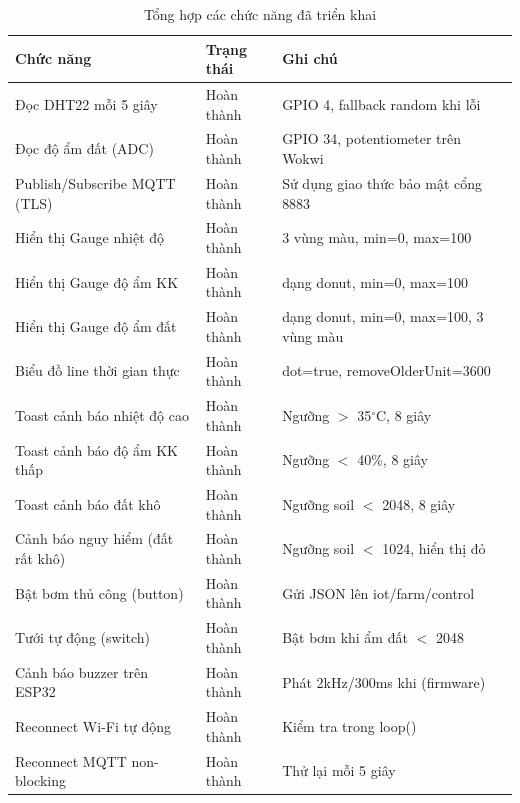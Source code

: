 \documentclass[12pt, a4paper]{article}
\newcommand{\code}[1]{\texttt{\detokenize{#1}}}
\begin{document}
\begin{table}[H]
  \centering
  \caption{Tổng hợp các chức năng đã triển khai}
  \label{tbl:chucnang}
  \begin{tabular}{|L{4cm}|C{3cm}|C{4.5cm}|}
    \hline
    \textbf{Chức năng} & \textbf{Trạng thái} & \textbf{Ghi chú} \\
    \hline
    Đọc DHT22 mỗi 5 giây & Hoàn thành & GPIO 4, fallback random khi lỗi \\
    \hline
    Đọc độ ẩm đất (ADC) & Hoàn thành & GPIO 34, potentiometer trên Wokwi \\
    \hline
    Publish/Subscribe MQTT (TLS) & Hoàn thành & Sử dụng giao thức bảo mật cổng 8883 \\
    \hline
    Hiển thị Gauge nhiệt độ & Hoàn thành & 3 vùng màu, min=0, max=100 \\
    \hline
    Hiển thị Gauge độ ẩm KK & Hoàn thành & dạng donut, min=0, max=100 \\
    \hline
    Hiển thị Gauge độ ẩm đất & Hoàn thành & dạng donut, min=0, max=100, 3 vùng màu \\
    \hline
    Biểu đồ line thời gian thực & Hoàn thành & dot=true, removeOlderUnit=3600 \\
    \hline
    Toast cảnh báo nhiệt độ cao & Hoàn thành & Ngưỡng $>$ 35$^\circ$C, 8 giây \\
    \hline
    Toast cảnh báo độ ẩm KK thấp & Hoàn thành & Ngưỡng $<$ 40\%, 8 giây \\
    \hline
    Toast cảnh báo đất khô & Hoàn thành & Ngưỡng soil $<$ 2048, 8 giây \\
    \hline
    Cảnh báo nguy hiểm (đất rất khô) & Hoàn thành & Ngưỡng soil $<$ 1024, hiển thị đỏ \\
    \hline
    Bật bơm thủ công (button) & Hoàn thành & Gửi JSON lên iot/farm/control \\
    \hline
    Tưới tự động (switch) & Hoàn thành & Bật bơm khi ẩm đất $<$ 2048 \\
    \hline
    Cảnh báo buzzer trên ESP32 & Hoàn thành & Phát 2kHz/300ms khi \code{soilRaw < 2048} (firmware) \\
    \hline
    Reconnect Wi-Fi tự động & Hoàn thành & Kiểm tra trong loop() \\
    \hline
    Reconnect MQTT non-blocking & Hoàn thành & Thử lại mỗi 5 giây \\
    \hline
  \end{tabular}
\end{table}

\end{document}
